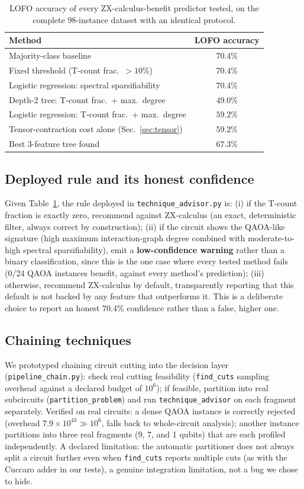 \documentclass[9pt,twocolumn]{extarticle}
\begin{document}
\begin{table}[t]
\centering\footnotesize
\caption{LOFO accuracy of every ZX-calculus-benefit predictor tested, on the
complete 98-instance dataset with an identical protocol.}
\label{tab:predictors}
\begin{tabular}{@{}lc@{}}
\toprule
Method & LOFO accuracy \\
\midrule
Majority-class baseline & $70.4\%$ \\
Fixed threshold (T-count frac.\ $>10\%$) & $70.4\%$ \\
Logistic regression: spectral sparsifiability & $70.4\%$ \\
Depth-2 tree: T-count frac.\ + max.\ degree & $49.0\%$ \\
Logistic regression: T-count frac.\ + max.\ degree & $59.2\%$ \\
Tensor-contraction cost alone (Sec.~\ref{sec:tensor}) & $59.2\%$ \\
Best 3-feature tree found & $67.3\%$ \\
\bottomrule
\end{tabular}
\end{table}

\subsection{Deployed rule and its honest confidence}
Given Table~\ref{tab:predictors}, the rule deployed in
\texttt{technique\_advisor.py} is: (i) if the T-count fraction is exactly
zero, recommend against ZX-calculus (an exact, deterministic filter, always
correct by construction); (ii) if the circuit shows the QAOA-like signature
(high maximum interaction-graph degree combined with moderate-to-high
spectral sparsifiability), emit a \textbf{low-confidence warning} rather
than a binary classification, since this is the one case where every tested
method fails (0/24 QAOA instances benefit, against every method's
prediction); (iii) otherwise, recommend ZX-calculus by default,
transparently reporting that this default is not backed by any feature that
outperforms it. This is a deliberate choice to report an honest $70.4\%$
confidence rather than a false, higher one.

\subsection{Chaining techniques}
We prototyped chaining circuit cutting into the decision layer
(\texttt{pipeline\_chain.py}): check real cutting feasibility
(\texttt{find\_cuts} sampling overhead against a declared budget of
$10^6$); if feasible, partition into real subcircuits
(\texttt{partition\_problem}) and run \texttt{technique\_advisor} on each
fragment separately. Verified on real circuits: a dense QAOA instance is
correctly rejected (overhead $7.9\times10^{43}\gg10^6$, falls back to
whole-circuit analysis); another instance partitions into three real
fragments (9, 7, and 1 qubits) that are each profiled independently. A
declared limitation: the automatic partitioner does not always split a
circuit further even when \texttt{find\_cuts} reports multiple cuts (as with
the Cuccaro adder in our tests), a genuine integration limitation, not a bug
we chose to hide.
\end{document}
